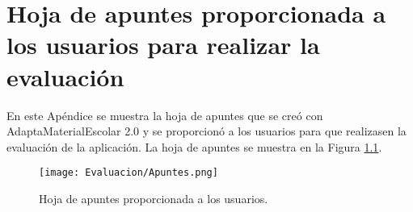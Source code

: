 \chapter{Hoja de apuntes proporcionada a los usuarios para realizar la evaluación}\label{ape:apuntesEvaluacion}

En este Apéndice se muestra la hoja de apuntes que se creó con AdaptaMaterialEscolar 2.0 y se proporcionó a los usuarios para que realizasen la evaluación de la aplicación. La hoja de apuntes se muestra en la Figura \ref{fig:apuntesEvaluacion}.

\begin{figure}[ht!]
    \centering
    \texttt{[image: Evaluacion/Apuntes.png]}
    \caption{Hoja de apuntes proporcionada a los usuarios.}
    \label{fig:apuntesEvaluacion}
\end{figure}
